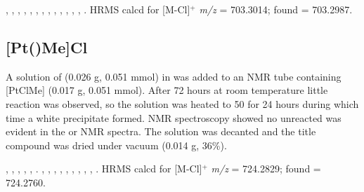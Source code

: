 ,
,
,
,
,
,
,
,
,
,
,
,
,
.
HRMS calcd for  [M-Cl]$^+$ \emph{m/z} = 703.3014; found = 703.2987.



\subsection*{[Pt(\tBusixantphos)Me]Cl}


A solution of \tBusixantphos{} (0.026 g, 0.051 mmol) in  was added to an NMR tube containing [PtClMe] (0.017 g, 0.051 mmol).  After 72 hours at room temperature little reaction was observed, so the solution was heated to 50\degC{} for 24 hours during which time a white precipitate formed.  NMR spectroscopy showed no unreacted \tBusixantphos{} was evident in the \proton{} or \phosphorus{} NMR spectra.  The solution was decanted and the title compound was dried under vacuum (0.014 g, 36\%).  

,
,
,
,
,
.
,
,
,
,
,
,
,
,
,
.
HRMS calcd for  [M-Cl]$^+$ \emph{m/z} = 724.2829; found = 724.2760.

